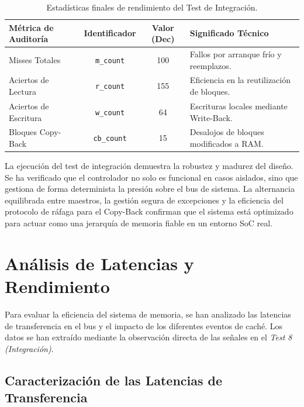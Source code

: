 \documentclass[12pt,a4paper]{article}
\begin{document}
\begin{table}[H]
\centering
\small
\renewcommand{\arraystretch}{1.2}
\begin{tabular}{|l|c|c|l|}
\hline
\rowcolor[HTML]{EFEFEF} 
\textbf{Métrica de Auditoría} & \textbf{Identificador} & \textbf{Valor (Dec)} & \textbf{Significado Técnico} \\ \hline
Misses Totales & \texttt{m\_count} & 100 & Fallos por arranque frío y reemplazos. \\ \hline
Aciertos de Lectura & \texttt{r\_count} & 155 & Eficiencia en la reutilización de bloques. \\ \hline
Aciertos de Escritura & \texttt{w\_count} & 64 & Escrituras locales mediante Write-Back. \\ \hline
Bloques Copy-Back & \texttt{cb\_count} & 15 & Desalojos de bloques modificados a RAM. \\ \hline
\end{tabular}
\caption{Estadísticas finales de rendimiento del Test de Integración.}
\label{tab:audit_final}
\end{table}

La ejecución del test de integración demuestra la robustez y madurez del diseño. Se ha verificado que el controlador no solo es funcional en casos aislados, sino que gestiona de forma determinista la presión sobre el bus de sistema. La alternancia equilibrada entre maestros, la gestión segura de excepciones y la eficiencia del protocolo de ráfaga para el Copy-Back confirman que el sistema está optimizado para actuar como una jerarquía de memoria fiable en un entorno SoC real.

\newpage


\newpage


\newpage

\section{Análisis de Latencias y Rendimiento}

Para evaluar la eficiencia del sistema de memoria, se han analizado las latencias de transferencia en el bus y el impacto de los diferentes eventos de caché. Los datos se han extraído mediante la observación directa de las señales en el \textit{Test 8 (Integración)}.

\subsection{Caracterización de las Latencias de Transferencia}
\end{document}
